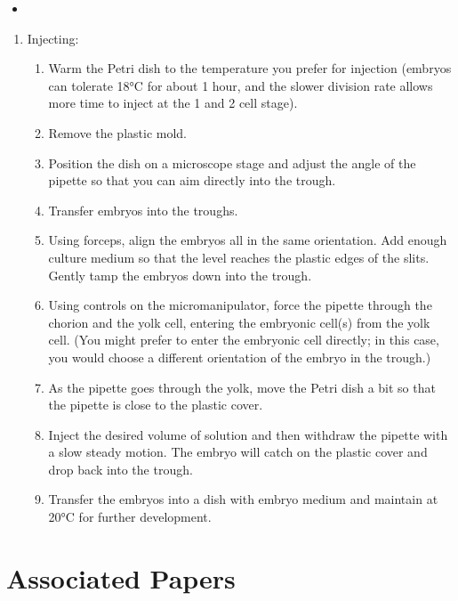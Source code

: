 \documentclass[
  letterpaper,
  DIV=11,
  numbers=noendperiod]{scrreprt}
\providecommand{\tightlist}{%
  \setlength{\itemsep}{0pt}\setlength{\parskip}{0pt}}\usepackage{longtable,booktabs,array}
\begin{document}
\begin{itemize}
\tightlist
\item
\end{itemize}

\begin{enumerate}
\def\labelenumi{\arabic{enumi}.}
\tightlist
\item
  Injecting:

  \begin{enumerate}
  \def\labelenumii{\arabic{enumii}.}
  \tightlist
  \item
    Warm the Petri dish to the temperature you prefer for injection
    (embryos can tolerate 18°C for about 1 hour, and the slower division
    rate allows more time to inject at the 1 and 2 cell stage).
  \item
    Remove the plastic mold.
  \item
    Position the dish on a microscope stage and adjust the angle of the
    pipette so that you can aim directly into the trough.
  \item
    Transfer embryos into the troughs.
  \item
    Using forceps, align the embryos all in the same orientation. Add
    enough culture medium so that the level reaches the plastic edges of
    the slits. Gently tamp the embryos down into the trough.
  \item
    Using controls on the micromanipulator, force the pipette through
    the chorion and the yolk cell, entering the embryonic cell(s) from
    the yolk cell. (You might prefer to enter the embryonic cell
    directly; in this case, you would choose a different orientation of
    the embryo in the trough.)
  \item
    As the pipette goes through the yolk, move the Petri dish a bit so
    that the pipette is close to the plastic cover.
  \item
    Inject the desired volume of solution and then withdraw the pipette
    with a slow steady motion. The embryo will catch on the plastic
    cover and drop back into the trough.
  \item
    Transfer the embryos into a dish with embryo medium and maintain at
    20°C for further development.
  \end{enumerate}
\end{enumerate}

\hypertarget{associated-papers-31}{%
\section{Associated Papers}\label{associated-papers-31}}
\end{document}
